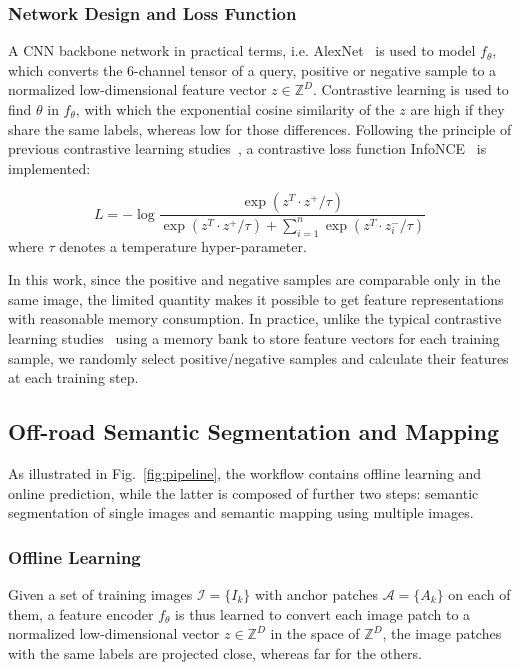 \documentclass[letterpaper, 10 pt, conference]{ieeeconf}  %
\begin{document}
	\subsubsection{Network Design and Loss Function}
	A CNN backbone network in practical terms, i.e. AlexNet~\cite{krizhevsky2012imagenet} is used to model $f_{\theta}$, which converts the 6-channel tensor of a query, positive or negative sample to a normalized low-dimensional feature vector $z\in \mathbb{Z}^D$.
	Contrastive learning is used to find $\theta$ in $f_{\theta}$, with which the exponential cosine similarity of the $z$ are high if they share the same labels, whereas low for those differences.
	Following the principle of previous contrastive learning studies~\cite{he2020momentum}, a contrastive loss function InfoNCE~\cite{oord2018representation} is implemented:
	
	\begin{equation}\label{loss}
	L=-\log {\dfrac{\exp (z^T \cdot z^+/\tau)}{\exp (z^T \cdot z^+/\tau)+\sum_{i=1}^{n}{\exp (z^T \cdot z_i^-/\tau)}}}
	\end{equation}
	where $\tau$ denotes a temperature hyper-parameter.
	
	In this work, since the positive and negative samples are comparable only in the same image, the limited quantity makes it possible to get feature representations with reasonable memory consumption. In practice, unlike the typical contrastive learning studies~\cite{Wu_2018_CVPR} using a memory bank to store feature vectors for each training sample, we randomly select positive/negative samples and calculate their features at each training step.
	
	\subsection{Off-road Semantic Segmentation and Mapping}
	
	As illustrated in Fig.~\ref{fig:pipeline}, the workflow contains offline learning and online prediction, while the latter is composed of further two steps: semantic segmentation of single images and semantic mapping using multiple images.
	
	\subsubsection{Offline Learning}
	Given a set of training images $\mathcal{I}=\{I_k\}$ with anchor patches $\mathcal{A}=\{A_k\}$ on each of them, a feature encoder $f_\theta$ is thus learned to convert each image patch to a normalized low-dimensional vector $z\in \mathbb{Z}^D$ in the space of $\mathbb{Z}^D$, the image patches with the same labels are projected close, whereas far for the others.
	
\end{document}
